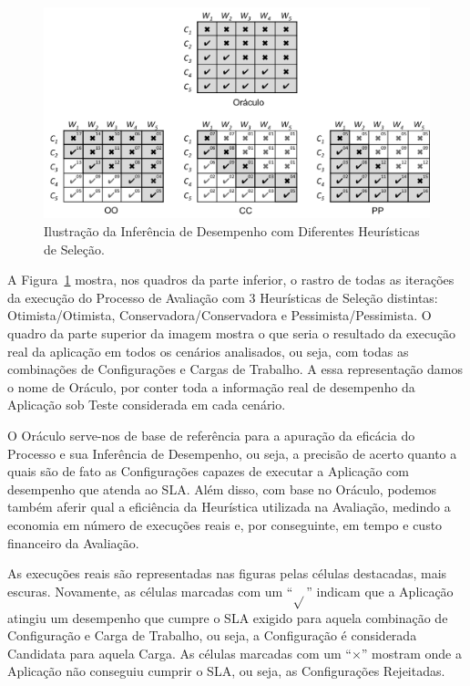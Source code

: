 \begin{figure}
  \begin{center}
    \includegraphics[scale=0.7]{img/rastros}
  \end{center}
  \caption{\label{fig:fig_processo_traces}Ilustração da Inferência de Desempenho com Diferentes Heurísticas de Seleção.}
\end{figure}

A Figura~\ref{fig:fig_processo_traces} mostra, nos quadros da parte inferior, 
o rastro de todas as iterações da execução do Processo de Avaliação com 3 
Heurísticas de Seleção distintas: Otimista/Otimista, Conservadora/Conservadora e 
Pessimista/Pessimista. O quadro da parte superior da imagem mostra o que seria o
resultado da execução real da aplicação em todos os cenários analisados, ou seja,
com todas as combinações de Configurações e Cargas de Trabalho. A essa 
representação damos o nome de Oráculo, por conter toda a informação real de
desempenho da Aplicação sob Teste considerada em cada cenário.

O Oráculo serve-nos de base de referência para a apuração da eficácia do Processo
e sua Inferência de Desempenho, ou seja, a precisão de acerto quanto a quais são
de fato as Configurações capazes de executar a Aplicação com desempenho que atenda
ao SLA. Além disso, com base no Oráculo, podemos também aferir qual a eficiência 
da Heurística utilizada na Avaliação, medindo a economia em número de execuções
reais e, por conseguinte, em tempo e custo financeiro da Avaliação.

As execuções reais são representadas nas figuras pelas células destacadas, mais 
escuras. Novamente, as células marcadas com um ``\boldmath$\surd{}$'' indicam que a Aplicação atingiu um
desempenho que cumpre o SLA exigido para aquela combinação de Configuração e Carga
de Trabalho, ou seja, a Configuração é considerada Candidata para aquela Carga. As
células marcadas com um ``\boldmath$\times$'' mostram onde a Aplicação não conseguiu cumprir 
o SLA, ou seja, as Configurações Rejeitadas.

